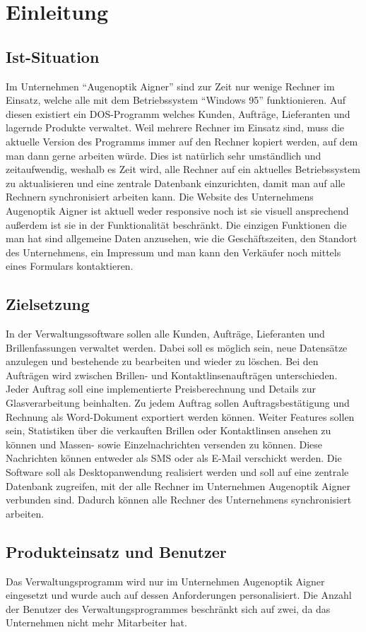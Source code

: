 \chapter{Einleitung}
\section{Ist-Situation}
Im Unternehmen “Augenoptik Aigner” sind zur Zeit nur wenige Rechner im Einsatz, welche alle mit dem Betriebssystem “Windows 95” funktionieren. Auf diesen existiert ein DOS-Programm welches Kunden,  Aufträge, Lieferanten und lagernde Produkte  verwaltet. Weil mehrere Rechner im Einsatz sind, muss die aktuelle Version des Programms immer auf den Rechner kopiert werden, auf dem man dann gerne arbeiten würde. Dies ist natürlich sehr umständlich und zeitaufwendig, weshalb es Zeit wird, alle Rechner auf ein aktuelles Betriebssystem zu aktualisieren und eine zentrale Datenbank einzurichten, damit man auf alle Rechnern synchronisiert arbeiten kann.\newline
Die Website des Unternehmens Augenoptik Aigner ist aktuell weder responsive noch ist sie visuell ansprechend außerdem ist sie in der Funktionalität beschränkt. Die einzigen Funktionen die man hat sind allgemeine Daten anzusehen, wie die Geschäftszeiten, den Standort des Unternehmens, ein Impressum und man kann den Verkäufer noch mittels eines Formulars kontaktieren. 

\section{Zielsetzung}
In der Verwaltungssoftware sollen alle Kunden, Aufträge, Lieferanten und Brillenfassungen verwaltet werden. Dabei soll es möglich sein, neue Datensätze anzulegen und bestehende zu bearbeiten und wieder zu löschen. Bei den Aufträgen wird zwischen Brillen- und Kontaktlinsenaufträgen unterschieden. Jeder Auftrag soll eine implementierte Preisberechnung und Details zur Glasverarbeitung beinhalten. Zu jedem Auftrag sollen Auftragsbestätigung und Rechnung als Word-Dokument exportiert werden können. \newline Weiter Features sollen sein, Statistiken über die verkauften Brillen oder Kontaktlinsen ansehen zu können und Massen- sowie Einzelnachrichten versenden zu können. Diese Nachrichten können entweder als SMS oder als E-Mail verschickt werden. \newline Die Software soll als Desktopanwendung realisiert werden und soll auf eine zentrale Datenbank zugreifen, mit der alle Rechner im Unternehmen Augenoptik Aigner verbunden sind. Dadurch können alle Rechner des Unternehmens synchronisiert arbeiten.

\section{Produkteinsatz und Benutzer}
Das Verwaltungsprogramm wird nur im Unternehmen Augenoptik Aigner eingesetzt und wurde auch auf dessen Anforderungen personalisiert. Die Anzahl der Benutzer des Verwaltungsprogrammes beschränkt sich auf zwei, da das Unternehmen nicht mehr Mitarbeiter hat.



